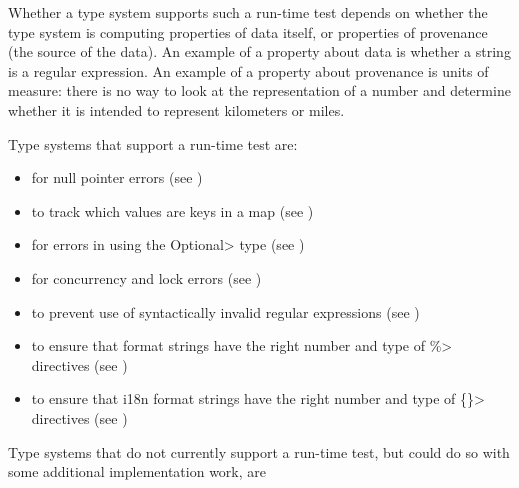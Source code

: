 Whether a type system supports such a run-time test depends on whether the
type system is computing properties of data itself, or properties of
provenance (the source of the data).  An example of a property about data is
whether a string is a regular expression.  An example of a property about
provenance is units of measure:  there is no way to look at the
representation of a number and determine whether it is intended to
represent kilometers or miles.


Type systems that support a run-time test are:
\begin{itemize}
\item
   for null pointer errors
  (see )
\item
   to track which values are
  keys in a map (see )
\item
   for errors in using the
  \<Optional> type (see )
\item
   for concurrency and lock errors
  (see )
\item
   to prevent use of syntactically
  invalid regular expressions (see )
\item
   to ensure that format
  strings have the right number and type of \<\%> directives (see
  )
\item
  to ensure that i18n format strings have the right number and type of
  \<\{\}> directives (see )
\end{itemize}


Type systems that do not currently support a run-time test, but could do so with some
additional implementation work, are

